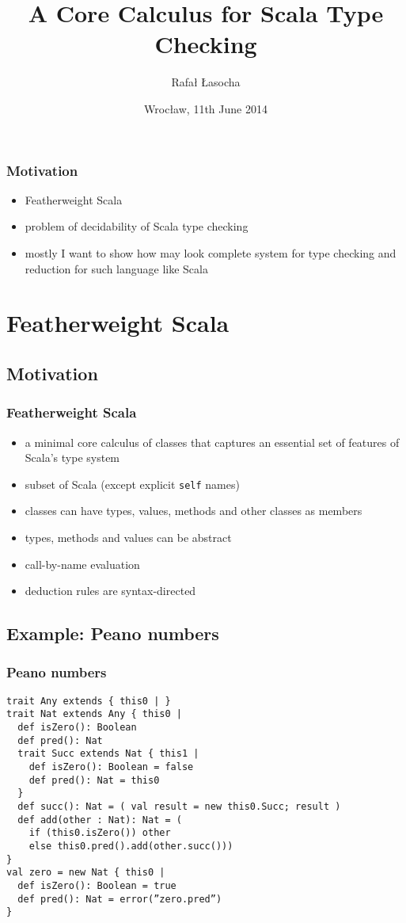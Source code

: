 \documentclass[aspectratio=169]{beamer}
\title{A Core Calculus for Scala Type Checking}
\author{Rafał Łasocha}
\date{Wrocław, 11th June 2014}
\begin{document}
  

\frame{\titlepage}

\begin{frame}
  \frametitle{Motivation}
  \begin{itemize}
    \item Featherweight Scala
    \item problem of decidability of Scala type checking
    \item mostly I want to show how may look complete system for type checking and reduction for such language like Scala
  \end{itemize}
\end{frame}

\section{Featherweight Scala}

\subsection{Motivation}

\begin{frame}
  \frametitle{Featherweight Scala}
  \begin{itemize}
  \item a minimal core calculus of classes that captures an essential set of features of Scala's type system
  \item subset of Scala (except explicit \texttt{self} names)
  \item classes can have types, values, methods and other classes as members
  \item types, methods and values can be abstract
  \item call-by-name evaluation
  \item deduction rules are syntax-directed
  \end{itemize}
\end{frame}

\subsection{Example: Peano numbers}

\begin{frame}[fragile]
\frametitle{Peano numbers}
\pause
\begin{lstlisting}
trait Any extends { this0 | }
trait Nat extends Any { this0 |
  def isZero(): Boolean
  def pred(): Nat
  trait Succ extends Nat { this1 |
    def isZero(): Boolean = false
    def pred(): Nat = this0
  }
  def succ(): Nat = ( val result = new this0.Succ; result )
  def add(other : Nat): Nat = (
    if (this0.isZero()) other
    else this0.pred().add(other.succ()))
}
val zero = new Nat { this0 |
  def isZero(): Boolean = true
  def pred(): Nat = error(”zero.pred”)
}
\end{lstlisting}
\end{frame}
\end{document}
